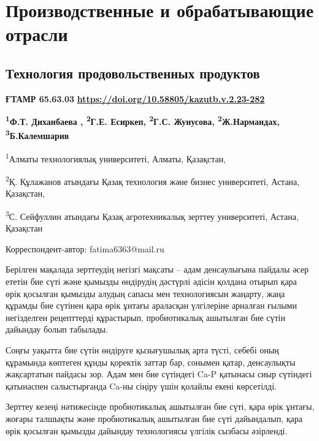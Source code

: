 \newpage
\let\cleardoublepage\clearpage
\part{Производственные и обрабатывающие отрасли}
\chapter{Технология продовольственных продуктов}

{\bfseries ҒТАМР 65.63.03}
\hfill {\bfseries \href{https://doi.org/10.58805/kazutb.v.2.23-282}{https://doi.org/10.58805/kazutb.v.2.23-282}}


\begin{center}
{\bfseries \textsuperscript{1}Ф.Т. Диханбаева , \textsuperscript{2}Г.Е. Есиркеп, \textsuperscript{2}Г.С. Жунусова, \textsuperscript{2}Ж.Нармандах, \textsuperscript{3}Б.Калемшарив}

\textsuperscript{1}Алматы технологиялық университеті, Алматы, Қазақстан,

\textsuperscript{2}Қ. Құлажанов атындағы Қазақ технология және бизнес
университеті, Астана, Қазақстан,

\textsuperscript{3}С. Сейфуллин атындағы Қазақ агротехникалық зерттеу
университеті, Астана, Қазақстан

Корреспондент-автор: fatima6363@mail.ru
\end{center}

Берілген мақалада зерттеудің негізгі мақсаты -- адам денсаулығына
пайдалы әсер ететін бие сүті және қымызды өндірудің дәстүрлі әдісін
қолдана отырып қара өрік қосылған қымызды алудың сапасы мен
технологиясын жаңарту, жаңа құрамды бие сүтінен қара өрік ұнтағы
араласқан үлгілеріне арналған ғылыми негізделген рецепттерді құрастырып,
пробиотикалық ашытылған бие сүтін дайындау болып табылады.

Соңғы уақытта бие сүтін өндіруге қызығушылық арта түсті, себебі оның
құрамында көптеген құнды қоректік заттар бар, сонымен қатар, денсаулықты
жақсартатын пайдасы зор. Адам мен бие сүтіндегі Ca-P қатынасы сиыр
сүтіндегі қатынаспен салыстырғанда Ca-ны сіңіру үшін қолайлы екені
көрсетілді.

Зерттеу кезеңі нәтижесінде пробиотикалық ашытылған бие сүті, қара өрік
ұнтағы, жоғары талшықты және пробиотикалық ашытылған бие сүті
дайындалып, қара өрік қосылған қымызды дайындау технологиясы үлгілік
сызбасы әзірленді.

